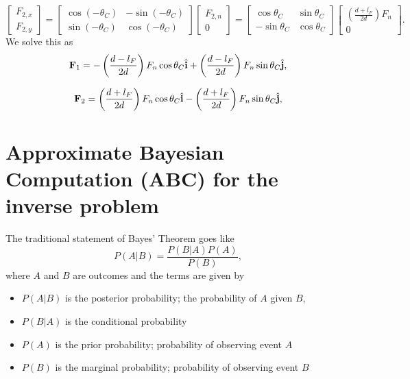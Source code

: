 \begin{equation*}
    \begin{bmatrix}
    F_{2,x} \\
    F_{2,y} 
    \end{bmatrix}
    =
    \begin{bmatrix}
    \cos{(-\theta_C)} & -\sin{(-\theta_C)}\\
    \sin{(-\theta_C)} & \cos{(-\theta_C)} 
    \end{bmatrix}
    \begin{bmatrix}
    F_{2,n} \\
    0 
    \end{bmatrix}
    =
    \begin{bmatrix}
    \cos{\theta_C} & \sin{\theta_C}\\
    -\sin{\theta_C} & \cos{\theta_C} 
    \end{bmatrix}
    \begin{bmatrix}
    \left( \frac{d+l_F}{2d} \right) F_n \\
    0 
    \end{bmatrix}.    
\end{equation*}
We solve this as
\begin{equation*}
  \vb{F}_1 =  - \left(\frac{d-l_F}{2d} \right)  F_n \cos{\theta_C} \hat{\vb{i}} + \left(\frac{d-l_F}{2d} \right)  F_n \sin{\theta_C} \hat{\vb{j}},
\end{equation*}

\begin{equation*}
  \vb{F}_2 =   \left(\frac{d+l_F}{2d} \right)  F_n \cos{\theta_C} \hat{\vb{i}} - \left(\frac{d+l_F}{2d} \right)  F_n \sin{\theta_C} \hat{\vb{j}},
\end{equation*}

\section{Approximate Bayesian Computation (ABC) for the inverse problem}
The traditional statement of Bayes' Theorem goes like
\begin{equation}
    P(A | B) = \frac{P(B|A) P(A)}{P(B)},
\end{equation}
where $A$ and $B$ are outcomes and the terms are given by
\begin{itemize}
    \item $P(A | B)$ is the posterior probability; the probability of $A$ given $B$,
    \item $P(B|A)$ is the conditional probability
    \item $P(A)$ is the prior probability; probability of observing event $A$
    \item $P(B)$ is the marginal probability; probability of observing event $B$
\end{itemize}








